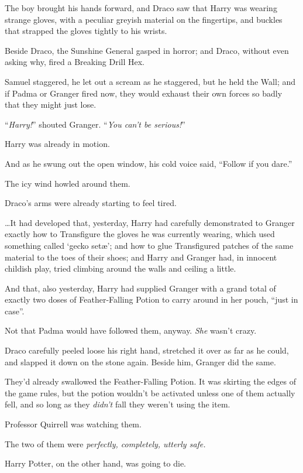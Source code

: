 The boy brought his hands forward, and Draco saw that Harry was wearing strange gloves, with a peculiar greyish material on the fingertips, and buckles that strapped the gloves tightly to his wrists.

Beside Draco, the Sunshine General gasped in horror; and Draco, without even asking why, fired a Breaking Drill Hex.

Samuel staggered, he let out a scream as he staggered, but he held the Wall; and if Padma or Granger fired now, they would exhaust their own forces so badly that they might just lose.

“\emph{Harry!}” shouted Granger. “\emph{You can’t be serious!}”

Harry was already in motion.

And as he swung out the open window, his cold voice said, “Follow if you dare.”

\later

The icy wind howled around them.

Draco’s arms were already starting to feel tired.

…It had developed that, yesterday, Harry had carefully demonstrated to Granger exactly how to Transfigure the gloves he was currently wearing, which used something called ‘gecko setæ’; and how to glue Transfigured patches of the same material to the toes of their shoes; and Harry and Granger had, in innocent childish play, tried climbing around the walls and ceiling a little.

And that, also yesterday, Harry had supplied Granger with a grand total of exactly two doses of Feather-Falling Potion to carry around in her pouch, “just in case”.

Not that Padma would have followed them, anyway. \emph{She} wasn’t crazy.

Draco carefully peeled loose his right hand, stretched it over as far as he could, and slapped it down on the stone again. Beside him, Granger did the same.

They’d already swallowed the Feather-Falling Potion. It was skirting the edges of the game rules, but the potion wouldn’t be activated unless one of them actually fell, and so long as they \emph{didn’t} fall they weren’t using the item.

Professor Quirrell was watching them.

The two of them were \emph{perfectly, completely, utterly safe.}

Harry Potter, on the other hand, was going to die.

